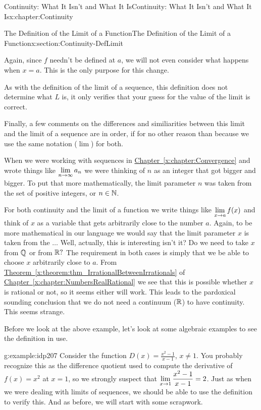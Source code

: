 \begin{chapterptx}{Continuity: What It Isn't and What It Is}{}{Continuity: What It Isn't and What It Is}{}{}{x:chapter:Continuity}
\begin{sectionptx}{The Definition of the Limit of a Function}{}{The Definition of the Limit of a Function}{}{}{x:section:Continuity-DefLimit}
\begin{equation*}
		\end{equation*}
		\par
		Again, since \(f\) needn't be defined at \(a\), we will not even consider what happens when \(x=a\). This is the only purpose for this change.%
		\par
		As with the definition of the limit of a sequence, this definition does not determine what \(L\) is, it only verifies that your guess for the value of the limit is correct.%
		\par
		Finally, a few comments on the differences and similiarities between this limit and the limit of a sequence are in order, if for no other reason than because we use the same notation (\(\lim\)) for both.%
		\par
		When we were working with sequences in \hyperref[x:chapter:Convergence]{Chapter~{\xreffont\ref{x:chapter:Convergence}}} and wrote things like \({\displaystyle\lim_{n\rightarrow \infty}a_n}\) we were thinking of \(n\) as an integer that got bigger and bigger.  To put that more mathematically, the limit parameter \(n\) was taken from the set of positive integers, or \(n\in \mathbb {N}\).%
		\par
		For both continuity and the limit of a function we write things like \({\displaystyle\lim_{x\rightarrow a}f(x)}\) and think of \(x\) as a variable that gets arbitrarily close to the number \(a\).  Again, to be more mathematical in our language we would say that the limit parameter \(x\) is taken from the \(\ldots\) Well, actually, this is interesting isn't it?  Do we need to take \(x\) from \(\mathbb {Q}\) or from \(\mathbb {R}?\) The requirement in both cases is simply that we be able to choose \(x\) arbitrarily close to \(a\). From \hyperref[x:theorem:thm_IrrationalBetweenIrrationals]{Theorem~{\xreffont\ref{x:theorem:thm_IrrationalBetweenIrrationals}}} of \hyperref[x:chapter:NumbersRealRational]{Chapter~{\xreffont\ref{x:chapter:NumbersRealRational}}} we see that this is possible whether \(x\) is rational or not, so it seems either will work.  This leads to the pardoxical sounding conclusion that we do not need a continuum (\(\mathbb {R}\)) to have continuity.  This seems strange.%
		\par
		Before we look at the above example, let's look at some algebraic examples to see the definition in use.%
		\begin{example}{}{g:example:idp207}%
			Consider the function \(D(x)=\frac{x^2-1}{x-1}\), \(x\neq 1\).  You probably recognize this as the difference quotient used to compute the derivative of \(f(x)=x^2\) at \(x=1\), so we strongly suspect that \({\displaystyle\lim_{x\rightarrow 1}\frac{x^2-1}{x-1}}=2\).  Just as when we were dealing with limits of sequences, we should be able to use the definition to verify this.  And as before, we will start with some scrapwork.%

\end{example}
\end{sectionptx}
\end{chapterptx}
